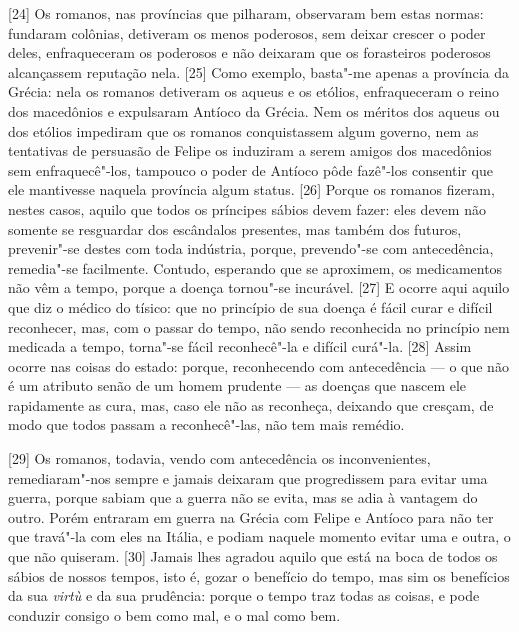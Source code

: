 {[}24{]} Os romanos, nas províncias que pilharam, observaram bem estas
normas: fundaram colônias, detiveram os menos poderosos, sem deixar
crescer o poder deles, enfraqueceram os poderosos e não deixaram que os
forasteiros poderosos alcançassem reputação nela. {[}25{]} Como exemplo,
basta"-me apenas a província da Grécia: nela os romanos detiveram os
aqueus e os etólios, enfraqueceram o reino dos macedônios e expulsaram
Antíoco da Grécia. Nem os méritos dos aqueus ou dos etólios impediram
que os romanos conquistassem algum governo, nem as tentativas de
persuasão de Felipe os induziram a serem amigos dos macedônios sem
enfraquecê"-los, tampouco o poder de Antíoco pôde fazê"-los consentir que
ele mantivesse naquela província algum status. {[}26{]} Porque os romanos
fizeram, nestes casos, aquilo que todos os príncipes sábios devem fazer:
eles devem não somente se resguardar dos escândalos presentes, mas
também dos futuros, prevenir"-se destes com toda indústria, porque,
prevendo"-se com antecedência, remedia"-se facilmente. Contudo, esperando
que se aproximem, os medicamentos não vêm a tempo, porque a doença
tornou"-se incurável. {[}27{]} E ocorre aqui aquilo que diz o
médico do tísico: que no
princípio de sua doença é fácil curar e difícil reconhecer, mas, com o
passar do tempo, não sendo reconhecida no princípio nem medicada a
tempo, torna"-se fácil reconhecê"-la e difícil curá"-la. {[}28{]} Assim
ocorre nas coisas do estado: porque, reconhecendo com antecedência --- o
que não é um atributo senão de um homem prudente --- as doenças que
nascem ele rapidamente as cura, mas, caso ele não as reconheça, deixando
que cresçam, de modo que todos passam a reconhecê"-las, não tem mais
remédio.

{[}29{]} Os romanos, todavia, vendo com antecedência os inconvenientes,
remediaram"-nos sempre e jamais deixaram que progredissem para evitar uma
guerra, porque sabiam que a guerra não se evita, mas se adia à vantagem
do outro. Porém entraram em guerra na Grécia com Felipe e Antíoco para
não ter que travá"-la com eles na Itália, e podiam naquele momento evitar
uma e outra, o que não quiseram. {[}30{]} Jamais lhes agradou aquilo que
está na boca de todos os sábios de nossos tempos, isto é, gozar o
benefício do tempo, mas sim os benefícios da sua \emph{virtù} e da sua
prudência: porque o tempo traz todas as coisas, e pode conduzir consigo
o bem como mal, e o mal como bem.

